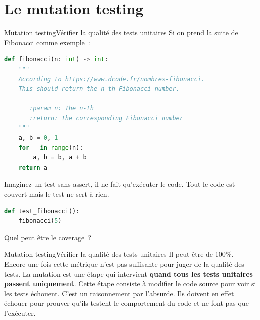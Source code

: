 \documentclass{beamer}
\begin{document}
    \section{Le mutation testing}\label{sec:mutation-testing}

    \begin{frame}[fragile]{Mutation testing}{Vérifier la qualité des tests unitaires}
        \transdissolve
        Si on prend la suite de Fibonacci comme exemple~:
        \begin{lstlisting}[language=Python,basicstyle=\ttfamily\tiny]
def fibonacci(n: int) -> int:
    """
    According to https://www.dcode.fr/nombres-fibonacci.
    This should return the n-th Fibonacci number.

       :param n: The n-th
       :return: The corresponding Fibonacci number
    """
    a, b = 0, 1
    for _ in range(n):
        a, b = b, a + b
    return a
        \end{lstlisting}
        Imaginez un test sans assert, il ne fait qu'exécuter le code.
        Tout le code est couvert mais le test ne sert à rien.
        \begin{lstlisting}[language=Python]
def test_fibonacci():
    fibonacci(5)
        \end{lstlisting}
        Quel peut être le coverage~?
    \end{frame}

    \begin{frame}[fragile]{Mutation testing}{Vérifier la qualité des tests unitaires}
        Il peut être de 100\%.
        Encore une fois cette métrique n'est pas suffisante pour juger de la qualité des tests.
        \bigbreak
        La mutation est une étape qui intervient \textbf{quand tous les tests unitaires passent uniquement}.
        Cette étape consiste à modifier le code source pour voir si les tests échouent.
        C'est un raisonnement par l'absurde.
        Ils doivent en effet échouer pour prouver qu'ils testent le comportement du code et ne font pas que l'exécuter.
    \end{frame}
\end{document}
